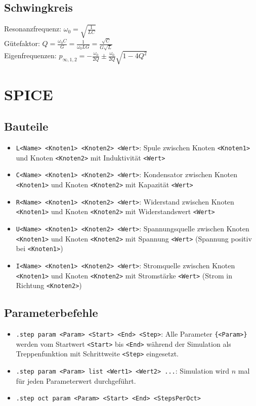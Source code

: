 \documentclass[fs, footer]{latex4ei}
\begin{document}
\begin{multicols*}{4}
    \subsection{Schwingkreis}
    Resonanzfrequenz: $\omega_0 = \sqrt{\frac{1}{LC}}$\\
    Gütefaktor: $Q = \frac{\omega_0C}{G} = \frac{1}{\omega_0LG} = \frac{\sqrt{C}}{G\sqrt{L}}$\\
    Eigenfrequenzen: $p_{\infty,1,2} = -\frac{\omega_0}{2Q}\pm \frac{\omega_0}{2Q}\sqrt{1-4Q^2}$
    \section{SPICE}
    \renewcommand{\t}{\texttt}
    \subsection{Bauteile}
    \begin{itemize}
        \item \t{L<Name> <Knoten1> <Knoten2> <Wert>}: Spule zwischen Knoten \t{<Knoten1>} und Knoten \t{<Knoten2>} mit Induktivität \t{<Wert>}
        \item \t{C<Name> <Knoten1> <Knoten2> <Wert>}: Kondensator zwischen Knoten \t{<Knoten1>} und Knoten \t{<Knoten2>} mit Kapazität \t{<Wert>}
        \item \t{R<Name> <Knoten1> <Knoten2> <Wert>}: Widerstand zwischen Knoten \t{<Knoten1>} und Knoten \t{<Knoten2>} mit Widerstandswert \t{<Wert>}
        \item \t{U<Name> <Knoten1> <Knoten2> <Wert>}: Spannungsquelle zwischen Knoten \t{<Knoten1>} und Knoten \t{<Knoten2>} mit Spannung \t{<Wert>} (Spannung positiv bei \t{<Knoten1>})
        \item \t{I<Name> <Knoten1> <Knoten2> <Wert>}: Stromquelle zwischen Knoten \t{<Knoten1>} und Knoten \t{<Knoten2>} mit Stromstärke \t{<Wert>} (Strom in Richtung \t{<Knoten2>})
    \end{itemize}
    \subsection{Parameterbefehle}
    \begin{itemize}
        \item \t{.step param <Param> <Start> <End> <Step>}: Alle Parameter \t{\{<Param>\}} werden vom Startwert \t{<Start>} bis \t{<End>} während der Simulation als Treppenfunktion mit Schrittweite \t{<Step>} eingesetzt.
        \item \t{.step param <Param> list <Wert1> <Wert2> ...}: Simulation wird $n$ mal für jeden Parameterwert durchgeführt.
        \item \t{.step oct param <Param> <Start> <End> <StepsPerOct>}
    \end{itemize}

\end{multicols*}
\end{document}
